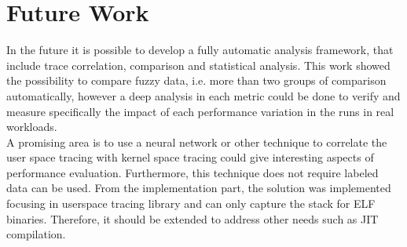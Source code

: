 \section{Future Work}
In the future it is possible to develop a fully automatic analysis framework, that include trace correlation, comparison and statistical analysis. 
This work showed the possibility to compare fuzzy data, i.e. more than two groups of comparison automatically, however a deep analysis in each metric could be done to verify and measure specifically the impact of each performance variation in the runs in real workloads. \\
A promising area is to use a neural network or other technique to correlate the user space tracing with kernel space tracing could give interesting aspects of performance evaluation. Furthermore, this technique does not require labeled data can be used.
From the implementation part, the solution was implemented focusing in userspace tracing library and can only capture the stack for ELF binaries. Therefore, it should be extended to address other needs such as JIT compilation.


